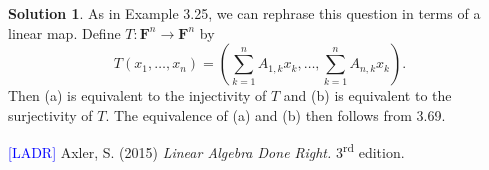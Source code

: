 \documentclass[12pt]{article}
\theoremstyle{definition}
\theoremstyle{exercise}
\theoremstyle{solution}
\newtheorem*{solution}{Solution}
\newcommand{\ts}{\textsuperscript}
\newcommand{\F}{\mathbf{F}}
\begin{document}
\begin{solution}
    As in Example 3.25, we can rephrase this question in terms of a linear map. Define \( T : \F^n \to \F^n \) by
    \[
        T(x_1, \ldots, x_n) = \left( \sum_{k=1}^n A_{1,k} x_k, \ldots, \sum_{k=1}^n A_{n,k} x_k \right).
    \]
    Then (a) is equivalent to the injectivity of \( T \) and (b) is equivalent to the surjectivity of \( T \). The equivalence of (a) and (b) then follows from 3.69.
\end{solution}

\noindent \hrulefill

\noindent \hypertarget{ladr}{\textcolor{blue}{[LADR]} Axler, S. (2015) \textit{Linear Algebra Done Right.} 3\ts{rd} edition.}
\end{document}
